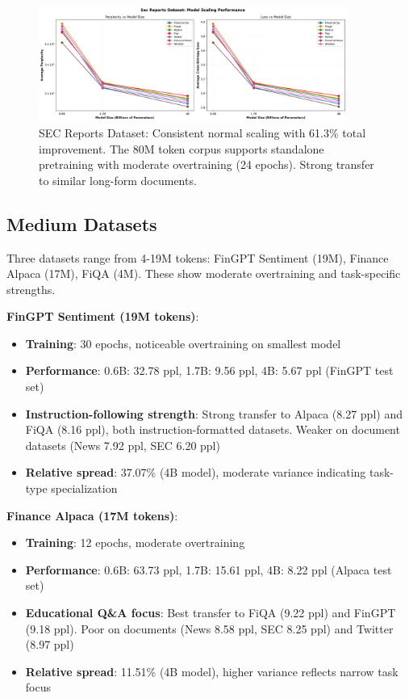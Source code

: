 \begin{figure}[h]
\centering
\includegraphics[width=0.9\textwidth]{figures/scaling_sec_reports.png}
\caption[SEC Reports Dataset: Scaling Behavior]{SEC Reports Dataset: Consistent normal scaling with 61.3\% total improvement. The 80M token corpus supports standalone pretraining with moderate overtraining (24 epochs). Strong transfer to similar long-form documents.}
\label{fig:scaling_sec_reports}
\end{figure}





\subsection{Medium Datasets}

Three datasets range from 4-19M tokens: FinGPT Sentiment (19M), Finance Alpaca (17M), FiQA (4M). These show moderate overtraining and task-specific strengths.

\textbf{FinGPT Sentiment (19M tokens)}:
\begin{itemize}
\item \textbf{Training}: 30 epochs, noticeable overtraining on smallest model
\item \textbf{Performance}: 0.6B: 32.78 ppl, 1.7B: 9.56 ppl, 4B: 5.67 ppl (FinGPT test set)
\item \textbf{Instruction-following strength}: Strong transfer to Alpaca (8.27 ppl) and FiQA (8.16 ppl), both instruction-formatted datasets. Weaker on document datasets (News 7.92 ppl, SEC 6.20 ppl)
\item \textbf{Relative spread}: 37.07\% (4B model), moderate variance indicating task-type specialization
\end{itemize}

\textbf{Finance Alpaca (17M tokens)}:
\begin{itemize}
\item \textbf{Training}: 12 epochs, moderate overtraining
\item \textbf{Performance}: 0.6B: 63.73 ppl, 1.7B: 15.61 ppl, 4B: 8.22 ppl (Alpaca test set)
\item \textbf{Educational Q\&A focus}: Best transfer to FiQA (9.22 ppl) and FinGPT (9.18 ppl). Poor on documents (News 8.58 ppl, SEC 8.25 ppl) and Twitter (8.97 ppl)
\item \textbf{Relative spread}: 11.51\% (4B model), higher variance reflects narrow task focus
\end{itemize}

